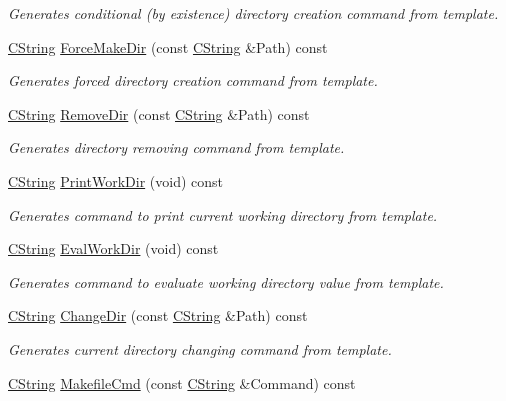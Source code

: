 \begin{DoxyCompactItemize}
\begin{DoxyCompactList}\small\item\em Generates conditional (by existence) directory creation command from template. \end{DoxyCompactList}\item 
\hyperlink{classCString}{C\-String} \hyperlink{classCPlatform_ab35ff6674109cf60162891407faa3648}{Force\-Make\-Dir} (const \hyperlink{classCString}{C\-String} \&Path) const 
\begin{DoxyCompactList}\small\item\em Generates forced directory creation command from template. \end{DoxyCompactList}\item 
\hyperlink{classCString}{C\-String} \hyperlink{classCPlatform_a492f16d41d38ad73ca4dc9b08c6d7db8}{Remove\-Dir} (const \hyperlink{classCString}{C\-String} \&Path) const 
\begin{DoxyCompactList}\small\item\em Generates directory removing command from template. \end{DoxyCompactList}\item 
\hyperlink{classCString}{C\-String} \hyperlink{classCPlatform_a5ad6b69255e929cbbf4369c59aed79d5}{Print\-Work\-Dir} (void) const 
\begin{DoxyCompactList}\small\item\em Generates command to print current working directory from template. \end{DoxyCompactList}\item 
\hyperlink{classCString}{C\-String} \hyperlink{classCPlatform_a0f459cbcbfe475f209224dfa277fa9a9}{Eval\-Work\-Dir} (void) const 
\begin{DoxyCompactList}\small\item\em Generates command to evaluate working directory value from template. \end{DoxyCompactList}\item 
\hyperlink{classCString}{C\-String} \hyperlink{classCPlatform_a623d7e98d0da8b225e011332a8b9f301}{Change\-Dir} (const \hyperlink{classCString}{C\-String} \&Path) const 
\begin{DoxyCompactList}\small\item\em Generates current directory changing command from template. \end{DoxyCompactList}\item 
\hyperlink{classCString}{C\-String} \hyperlink{classCPlatform_afb719a9e70c8052940830e4ccedf894c}{Makefile\-Cmd} (const \hyperlink{classCString}{C\-String} \&Command) const 

\end{DoxyCompactItemize}
